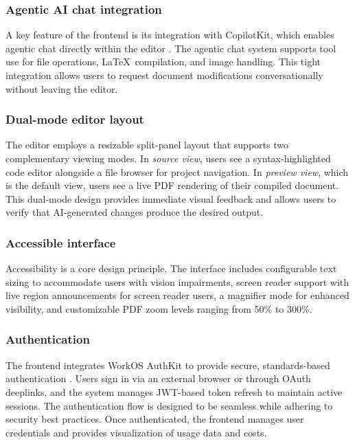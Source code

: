 \subsubsection{Agentic AI chat integration}

A key feature of the frontend is its integration with CopilotKit, which enables agentic chat directly within the editor \cite{copilotkit}.
The agentic chat system supports tool use for file operations, \LaTeX\ compilation, and image handling.
This tight integration allows users to request document modifications conversationally without leaving the editor.

\subsubsection{Dual-mode editor layout}

The editor employs a resizable split-panel layout that supports two complementary viewing modes.
In \emph{source view}, users see a syntax-highlighted code editor alongside a file browser for project navigation.
In \emph{preview view}, which is the default view, users see a live PDF rendering of their compiled document.
This dual-mode design provides immediate visual feedback and allows users to verify that AI-generated changes produce the desired output.

\subsubsection{Accessible interface}

Accessibility is a core design principle.
The interface includes configurable text sizing to accommodate users with vision impairments, screen reader support with live region announcements for screen reader users, a magnifier mode for enhanced visibility, and customizable PDF zoom levels ranging from 50\% to 300\%.

\subsubsection{Authentication}

The frontend integrates WorkOS AuthKit to provide secure, standards-based authentication \cite{workos}.
Users sign in via an external browser or through OAuth deeplinks, and the system manages JWT-based token refresh to maintain active sessions.
The authentication flow is designed to be seamless while adhering to security best practices.
Once authenticated, the frontend manages user credentials and provides visualization of usage data and costs.

